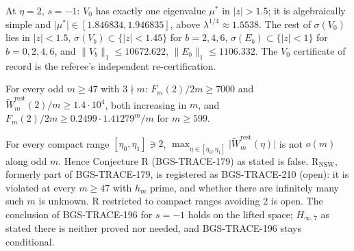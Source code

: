 \begin{theorem}
At \(\eta=2\), \(s=-1\): \(V_0\) has exactly one eigenvalue \(\mu^*\) in \(\lvert z\rvert>1.5\); it is algebraically simple and \(\lvert\mu^*\rvert\in[1.846834,1.946835]\), above \(\lambda^{1/4}\approx1.5538\). The rest of \(\sigma(V_0)\) lies in \(\lvert z\rvert<1.5\), \(\sigma(V_b)\subset\{\lvert z\rvert<1.45\}\) for \(b=2,4,6\), \(\sigma(E_b)\subset\{\lvert z\rvert<1\}\) for \(b=0,2,4,6\), and \(\lVert V_b\rVert_1\le10672.622\), \(\lVert E_b\rVert_1\le1106.332\). The \(V_0\) certificate of record is the referee's independent re-certification.
\end{theorem}

\begin{theorem}
For every odd \(m\ge47\) with \(3\nmid m\): \(F_m(2)/2m\ge7000\) and \(\tilde W^{\mathrm{rest}}_m(2)/m\ge1.4\cdot10^4\), both increasing in \(m\), and \(F_m(2)/2m\ge0.2499\cdot1.41279^m/m\) for \(m\ge599\).
\end{theorem}

\begin{corollary}
For every compact range \([\eta_0,\eta_1]\ni2\), \(\max_{\eta\in[\eta_0,\eta_1]}\lvert\tilde W^{\mathrm{rest}}_m(\eta)\rvert\) is not \(o(m)\) along odd \(m\). Hence Conjecture R (BGS-TRACE-179) as stated is false. R\(_{\mathrm{NSW}}\), formerly part of BGS-TRACE-179, is registered as BGS-TRACE-210 (open): it is violated at every \(m\ge47\) with \(h_m\) prime, and whether there are infinitely many such \(m\) is unknown. R restricted to compact ranges avoiding \(2\) is open. The conclusion of BGS-TRACE-196 for \(s=-1\) holds on the lifted space; \(H_{\infty,7}\) as stated there is neither proved nor needed, and BGS-TRACE-196 stays conditional.
\end{corollary}
